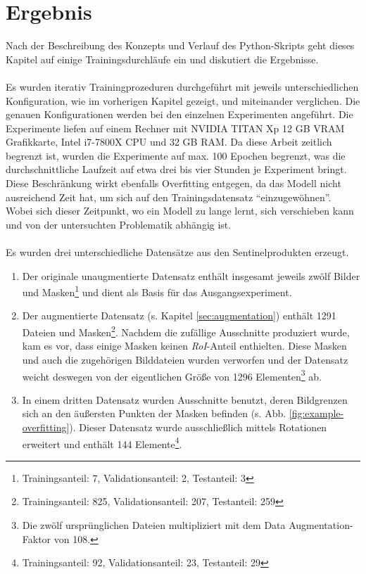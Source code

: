 \chapter{Ergebnis}\label{chap:experiments}

Nach der Beschreibung des Konzepts und Verlauf des Python-Skripts geht dieses Kapitel auf einige Trainingsdurchläufe ein  und diskutiert die Ergebnisse. 
\\\\
Es wurden iterativ Trainingprozeduren durchgeführt mit jeweils unterschiedlichen Konfiguration, wie im vorherigen Kapitel gezeigt, und miteinander verglichen. Die genauen Konfigurationen werden bei den einzelnen Experimenten angeführt. Die Experimente liefen auf einem Rechner mit NVIDIA TITAN Xp 12 GB VRAM Grafikkarte, Intel i7-7800X CPU und 32 GB RAM. Da diese Arbeit zeitlich begrenzt ist, wurden die Experimente auf max. 100 Epochen begrenzt, was die durchschnittliche Laufzeit auf etwa drei bis vier Stunden je Experiment bringt. Diese Beschränkung wirkt ebenfalls Overfitting entgegen, da das Modell nicht ausreichend Zeit hat, um sich auf den Trainingsdatensatz "`einzugewöhnen"'. Wobei sich dieser Zeitpunkt, wo ein Modell zu lange lernt, sich verschieben kann und von der untersuchten Problematik abhängig ist.
\\\\
Es wurden drei unterschiedliche Datensätze aus den Sentinelprodukten erzeugt. 
\begin{enumerate}
	\item Der originale unaugmentierte Datensatz enthält insgesamt jeweils zwölf Bilder und Masken\footnote{Trainingsanteil: 7, Validationsanteil: 2, Testanteil: 3} und dient als Basis für das Ausgangsexperiment. 
	\item Der augmentierte Datensatz (s. Kapitel \ref{sec:augmentation}) enthält 1291 Dateien und Masken\footnote{Trainingsanteil: 825, Validationsanteil: 207, Testanteil: 259}. Nachdem die zufällige Ausschnitte produziert wurde, kam es vor, dass einige Masken keinen \textit{RoI}-Anteil enthielten. Diese Masken und auch die zugehörigen Bilddateien wurden verworfen und der Datensatz weicht deswegen von der eigentlichen Größe von 1296 Elementen\footnote{Die zwölf ursprünglichen Dateien multipliziert mit dem Data Augmentation-Faktor von 108.} ab.
	\item In einem dritten Datensatz wurden Ausschnitte benutzt, deren Bildgrenzen sich an den äußersten Punkten der Masken befinden (s. Abb. \ref{fig:example-overfitting}). Dieser Datensatz wurde ausschließlich mittels Rotationen erweitert und enthält 144 Elemente\footnote{Trainingsanteil: 92, Validationsanteil: 23, Testanteil: 29}. 
\end{enumerate}
\noindent

